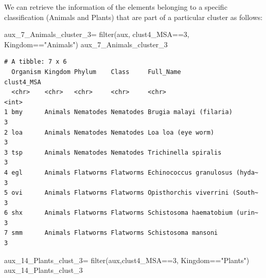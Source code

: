 \documentclass[
  letterpaper,
  DIV=11,
  numbers=noendperiod]{scrreprt}
\newenvironment{Shaded}{}{}
\newcommand{\DecValTok}[1]{\textcolor[rgb]{0.82,0.60,0.40}{#1}}
\newcommand{\FunctionTok}[1]{\textcolor[rgb]{0.38,0.69,0.94}{#1}}
\newcommand{\NormalTok}[1]{\textcolor[rgb]{0.67,0.70,0.75}{#1}}
\newcommand{\OtherTok}[1]{\textcolor[rgb]{0.15,0.68,0.38}{#1}}
\newcommand{\SpecialCharTok}[1]{\textcolor[rgb]{0.34,0.71,0.76}{#1}}
\newcommand{\StringTok}[1]{\textcolor[rgb]{0.60,0.76,0.47}{#1}}
\begin{document}
We can retrieve the information of the elements belonging to a specific
classification (Animals and Plants) that are part of a particular
cluster as follows:

\begin{Shaded}
\begin{Highlighting}[]
\NormalTok{aux\_7\_Animals\_cluster\_3}\OtherTok{=} \FunctionTok{filter}\NormalTok{(aux,}
\NormalTok{                                clust4\_MSA}\SpecialCharTok{==}\DecValTok{3}\NormalTok{,}
\NormalTok{                                Kingdom}\SpecialCharTok{==}\StringTok{"Animals"}\NormalTok{)}
\NormalTok{aux\_7\_Animals\_cluster\_3}
\end{Highlighting}
\end{Shaded}

\begin{verbatim}
# A tibble: 7 x 6
  Organism Kingdom Phylum    Class     Full_Name                      clust4_MSA
  <chr>    <chr>   <chr>     <chr>     <chr>                               <int>
1 bmy      Animals Nematodes Nematodes Brugia malayi (filaria)                 3
2 loa      Animals Nematodes Nematodes Loa loa (eye worm)                      3
3 tsp      Animals Nematodes Nematodes Trichinella spiralis                    3
4 egl      Animals Flatworms Flatworms Echinococcus granulosus (hyda~          3
5 ovi      Animals Flatworms Flatworms Opisthorchis viverrini (South~          3
6 shx      Animals Flatworms Flatworms Schistosoma haematobium (urin~          3
7 smm      Animals Flatworms Flatworms Schistosoma mansoni                     3
\end{verbatim}

\begin{Shaded}
\begin{Highlighting}[]
\NormalTok{aux\_14\_Plants\_clust\_3}\OtherTok{=} \FunctionTok{filter}\NormalTok{(aux,clust4\_MSA}\SpecialCharTok{==}\DecValTok{3}\NormalTok{,}
\NormalTok{                             Kingdom}\SpecialCharTok{==}\StringTok{"Plants"}\NormalTok{)}
\NormalTok{aux\_14\_Plants\_clust\_3}
\end{Highlighting}
\end{Shaded}
\end{document}
